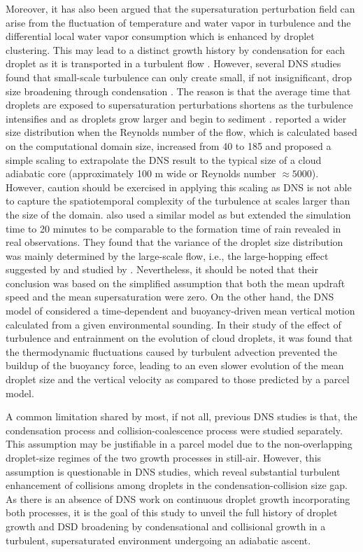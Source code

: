 Moreover, it has also been argued that the supersaturation perturbation field can arise from the fluctuation of temperature and water vapor in turbulence and the differential local water vapor consumption \citep{Srivastava1989} which is enhanced by droplet clustering. This may lead to a distinct growth history by condensation for each droplet as it is transported in a turbulent flow \citep{Lanotte2009}. However, several DNS studies found that small-scale turbulence can only create small, if not insignificant, drop size broadening through condensation \citep{Vaillancourt2002,Lanotte2009, Sardina2015}. The reason is that the average time that droplets are exposed to supersaturation perturbations shortens as the turbulence intensifies and as droplets grow larger and begin to sediment \citep{Vaillancourt2002}. \citet{Lanotte2009} reported a wider size distribution when the Reynolds number of the flow, which is calculated based on the computational domain size, increased from 40 to 185 and proposed a simple scaling to extrapolate the DNS result to the typical size of a cloud adiabatic core (approximately 100 m wide or Reynolds number $\approx 5000$). However, caution should be exercised in applying this scaling as DNS is not able to capture the spatiotemporal complexity of the turbulence at scales larger than the size of the domain. \citet{Sardina2015} also used a similar model as \citet{Lanotte2009} but extended the simulation time to 20 minutes to be comparable to the formation time of rain revealed in real observations. They found that the variance of the droplet size distribution was mainly determined by the large-scale flow, i.e., the large-hopping effect suggested by \citet{Grabowski2013} and studied by \citet{grabowski2017}. Nevertheless, it should be noted that their conclusion was based on the simplified assumption that both the mean updraft speed and the mean supersaturation were zero. On the other hand, the DNS model of \citet{Gotoh2016} considered a time-dependent and buoyancy-driven mean vertical motion calculated from a given environmental sounding. In their study of the effect of turbulence and entrainment on the evolution of cloud droplets, it was found that the thermodynamic fluctuations caused by turbulent advection prevented the buildup of the buoyancy force, leading to an even slower evolution of the mean droplet size and the vertical velocity as compared to those predicted by a parcel model. 

A common limitation shared by most, if not all, previous DNS studies is that, the condensation process and collision-coalescence process were studied separately. This assumption may be justifiable in a parcel model due to the non-overlapping droplet-size regimes of the two growth processes in still-air. However, this assumption is questionable in DNS studies, which reveal substantial turbulent enhancement of collisions among droplets in the condensation-collision size gap. As there is an absence of DNS work on continuous droplet growth incorporating both processes, it is the goal of this study to unveil the full history of droplet growth and DSD broadening by condensational and collisional growth in a turbulent, supersaturated environment undergoing an adiabatic ascent. 

